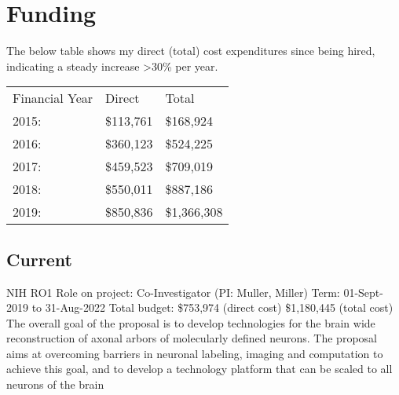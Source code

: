 \documentclass[10pt,colorlinks=true,urlcolor=blue]{moderncv}
\begin{document}
\begin{refsection} %
\nocite{*}
\printbibliography[%
    title=\href{https://neurodata.io/publications/\#pre_prints}{Manuscripts in Preparation for Submission},%
    heading=subbibliography%
    ]
\end{refsection}

%
\newpage
\section{Funding}

The below table shows my direct (total) cost expenditures since being hired, indicating a steady increase >30\% per year.

\centering
\begin{tabular}{p{3cm}p{2cm}p{3cm}}
Financial Year & Direct & Total \\
2015: & \$113,761 & \$168,924 \\
2016: & \$360,123 & \$524,225 \\
2017: & \$459,523 & \$709,019 \\
2018: & \$550,011 & \$887,186 \\
2019: & \$850,836 & \$1,366,308
\end{tabular}


\subsection{Current}
{\newline NIH RO1 \newline Role on project: Co-Investigator (PI: Muller, Miller)
\newline Term: 01-Sept-2019 to 31-Aug-2022
\newline Total budget: \$753,974 (direct cost) \$1,180,445 (total cost)
\newline The overall goal of the proposal is to develop technologies for the brain wide reconstruction
of axonal arbors of molecularly defined neurons. The proposal aims at overcoming barriers
in neuronal labeling, imaging and computation to achieve this goal, and to develop a
technology platform that can be scaled to all neurons of the brain}{}{}{}{}
\end{document}
